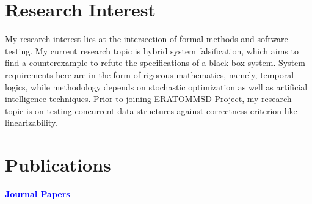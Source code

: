 \documentclass[11pt,a4paper]{moderncv}
\begin{document}

\section{Research Interest}
My research interest lies at the intersection of formal methods and software testing. My current research topic is hybrid system falsification, which aims to find a counterexample to refute the specifications of a black-box system. System requirements here are in the form of rigorous mathematics, namely, temporal logics, while methodology depends on stochastic optimization as well as artificial intelligence techniques. Prior to joining ERATOMMSD Project, my research topic is on testing concurrent data structures against correctness criterion like linearizability.
 

\section{Publications}
\quad\quad\quad \large{\textbf{\textcolor{blue}{Journal Papers}}}\\

\end{document}
